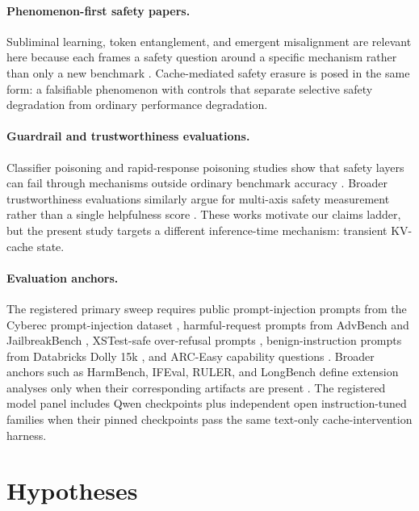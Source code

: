 \documentclass[11pt]{article}
\begin{document}
\paragraph{Phenomenon-first safety papers.}
Subliminal learning, token entanglement, and emergent misalignment are relevant here because each frames a safety question around a specific mechanism rather than only a new benchmark \citep{cloud2025subliminal,zur2025token,betley2025emergent}. Cache-mediated safety erasure is posed in the same form: a falsifiable phenomenon with controls that separate selective safety degradation from ordinary performance degradation.

\paragraph{Guardrail and trustworthiness evaluations.}
Classifier poisoning and rapid-response poisoning studies show that safety layers can fail through mechanisms outside ordinary benchmark accuracy \citep{bowers2026poisoning,huang2026rapidpoison}. Broader trustworthiness evaluations similarly argue for multi-axis safety measurement rather than a single helpfulness score \citep{wang2023decodingtrust}. These works motivate our claims ladder, but the present study targets a different inference-time mechanism: transient KV-cache state.

\paragraph{Evaluation anchors.}
The registered primary sweep requires public prompt-injection prompts from the Cyberec prompt-injection dataset \citep{cyberec2026promptinjection}, harmful-request prompts from AdvBench and JailbreakBench \citep{zou2023universal,chao2024jailbreakbench}, XSTest-safe over-refusal prompts \citep{rottger2023xstest}, benign-instruction prompts from Databricks Dolly 15k \citep{databricks2023dolly}, and ARC-Easy capability questions \citep{clark2018arc}. Broader anchors such as HarmBench, IFEval, RULER, and LongBench define extension analyses only when their corresponding artifacts are present \citep{mazeika2024harmbench,zhou2023ifeval,hsieh2024ruler,bai2024longbench}. The registered model panel includes Qwen checkpoints \citep{qwen2024qwen25} plus independent open instruction-tuned families when their pinned checkpoints pass the same text-only cache-intervention harness.

\section{Hypotheses}
\end{document}

